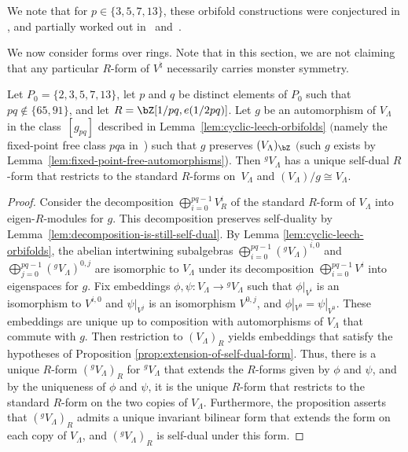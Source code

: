 We note that for $p \in \{3,5,7,13\}$, these orbifold constructions were conjectured in \cite{FLM88}, and partially worked out in~\cite{DM94b} and~\cite{M95}.

We now consider forms over rings. Note that in this section, we are not claiming that any particular $R$-form of $V^\natural$ necessarily carries monster symmetry.

\begin{lem} \label{lem:R-form-for-ALY-algebra}Let $P_0 = \{ 2,3,5,7,13\}$, let $p$ and $q$ be distinct elements of $P_0$ such that $pq \not\in \{65, 91\}$, and let $R = \bZ[1/pq, e(1/2pq)]$. Let $g$ be an automorphism of $V_\Lambda$ in the class~$[g_{pq}]$ described in Lemma~{\rm \ref{lem:cyclic-leech-orbifolds}} $($namely the fixed-point free class $pq\mathrm{a}$ in~{\rm \cite{GAP})} such that $g$ preserves $(V_\Lambda)_\bZ$ $($such $g$ exists by Lemma~{\rm \ref{lem:fixed-point-free-automorphisms})}. Then ${}^gV_\Lambda$ has a unique self-dual $R$-form that restricts to the standard $R$-forms on~$V_\Lambda$ and $(V_\Lambda)/g \cong V_\Lambda$.
\end{lem}
\begin{proof}Consider the decomposition $\bigoplus_{i=0}^{pq-1} V^i_R$ of the standard $R$-form of $V_\Lambda$ into eigen-$R$-modules for $g$. This decomposition preserves self-duality by Lemma~\ref{lem:decomposition-is-still-self-dual}. By Lemma \ref{lem:cyclic-leech-orbifolds}, the abelian intertwining subalgebras $\bigoplus_{i=0}^{pq-1} ({}^gV_\Lambda)^{i,0}$ and $\bigoplus_{j=0}^{pq-1} ({}^gV_\Lambda)^{0,j}$ are isomorphic to $V_\Lambda$ under its decomposition $\bigoplus_{i=0}^{pq-1} V^i$ into eigenspaces for $g$. Fix embeddings $\phi, \psi\colon V_\Lambda \to {}^gV_\Lambda$ such that $\phi|_{V^i}$ is an isomorphism to $V^{i,0}$ and $\psi|_{V^j}$ is an isomorphism $V^{0,j}$, and $\phi|_{V^0} = \psi|_{V^0}$. These embeddings are unique up to composition with automorphisms of $V_\Lambda$ that commute with $g$. Then restriction to $(V_\Lambda)_R$ yields embeddings that satisfy the hypotheses of Proposition \ref{prop:extension-of-self-dual-form}. Thus, there is a unique $R$-form $({}^gV_\Lambda)_R$ for ${}^gV_\Lambda$ that extends the $R$-forms given by $\phi$ and $\psi$, and by the uniqueness of $\phi$ and $\psi$, it is the unique $R$-form that restricts to the standard $R$-form on the two copies of $V_\Lambda$. Furthermore, the proposition asserts that $({}^gV_\Lambda)_R$ admits a unique invariant bilinear form that extends the form on each copy of $V_\Lambda$, and $({}^gV_\Lambda)_R$ is self-dual under this form.
\end{proof}

